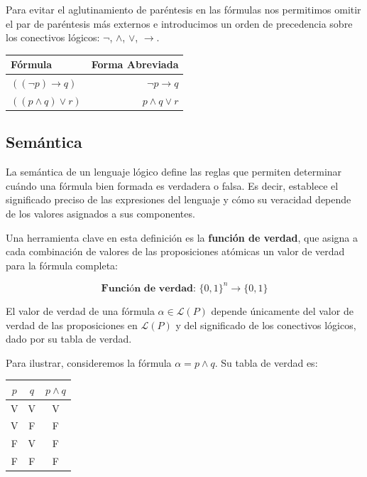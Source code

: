 Para evitar el aglutinamiento de paréntesis en las fórmulas nos permitimos omitir el par de paréntesis más externos e introducimos un orden de precedencia sobre los conectivos lógicos: $\lnot$, $\land$, $\lor$, $\rightarrow$.

\bigskip


\begin{center}
    \begin{tabular}{@{} lr @{}}
        \toprule
        Fórmula & Forma Abreviada\\
        \midrule
        $( (\lnot p) \rightarrow q)$ & $\lnot p \rightarrow q$ \\
        $((p \land q) \lor r)$ & $p \land q \lor r$\\
        \bottomrule
    \end{tabular}
\end{center}



\subsection{Semántica}


La semántica de un lenguaje lógico define las reglas que permiten determinar cuándo una fórmula bien formada es verdadera o falsa. Es decir, establece el significado preciso de las expresiones del lenguaje y cómo su veracidad depende de los valores asignados a sus componentes.

Una herramienta clave en esta definición es la \textbf{función de verdad}, que asigna a cada combinación de valores de las proposiciones atómicas un valor de verdad para la fórmula completa:

\[
\textbf{Función de verdad: }\{0,1\}^n \rightarrow \{0,1\}
\]

El valor de verdad de una fórmula $\alpha \in \mathcal{L}(P)$ depende únicamente del valor de verdad de las proposiciones en $\mathcal{L}(P)$ y del significado de los conectivos lógicos, dado por su \alert{tabla de verdad}.

\bigskip

Para ilustrar, consideremos la fórmula $\alpha = p \land q$. Su tabla de verdad es:
\begin{center}
\begin{tabular}{c|c|c}
    $p$ & $q$ & $p \land q$ \\
    \hline
    V & V & V \\
    V & F & F \\
    F & V & F \\
    F & F & F \\
\end{tabular}
\end{center}

